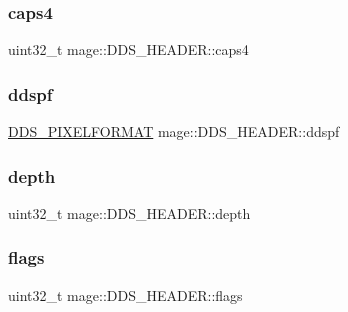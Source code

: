 \subsubsection{\texorpdfstring{caps4}{caps4}}
{\footnotesize\ttfamily uint32\+\_\+t mage\+::\+D\+D\+S\+\_\+\+H\+E\+A\+D\+E\+R\+::caps4}

\hypertarget{structmage_1_1_d_d_s___h_e_a_d_e_r_af7a75b761a23052acab158294208b5d8}{}\label{structmage_1_1_d_d_s___h_e_a_d_e_r_af7a75b761a23052acab158294208b5d8} 
\subsubsection{\texorpdfstring{ddspf}{ddspf}}
{\footnotesize\ttfamily \hyperlink{structmage_1_1_d_d_s___p_i_x_e_l_f_o_r_m_a_t}{D\+D\+S\+\_\+\+P\+I\+X\+E\+L\+F\+O\+R\+M\+AT} mage\+::\+D\+D\+S\+\_\+\+H\+E\+A\+D\+E\+R\+::ddspf}

\hypertarget{structmage_1_1_d_d_s___h_e_a_d_e_r_a7852a4695a8f8a2eb6b6fe5b3d9397ba}{}\label{structmage_1_1_d_d_s___h_e_a_d_e_r_a7852a4695a8f8a2eb6b6fe5b3d9397ba} 
\subsubsection{\texorpdfstring{depth}{depth}}
{\footnotesize\ttfamily uint32\+\_\+t mage\+::\+D\+D\+S\+\_\+\+H\+E\+A\+D\+E\+R\+::depth}

\hypertarget{structmage_1_1_d_d_s___h_e_a_d_e_r_a9058659a1eba7d049f5addd09791439e}{}\label{structmage_1_1_d_d_s___h_e_a_d_e_r_a9058659a1eba7d049f5addd09791439e} 
\subsubsection{\texorpdfstring{flags}{flags}}
{\footnotesize\ttfamily uint32\+\_\+t mage\+::\+D\+D\+S\+\_\+\+H\+E\+A\+D\+E\+R\+::flags}

\hypertarget{structmage_1_1_d_d_s___h_e_a_d_e_r_add2352edab3631c2d78ff1ec5d027fbc}{}\label{structmage_1_1_d_d_s___h_e_a_d_e_r_add2352edab3631c2d78ff1ec5d027fbc} 
